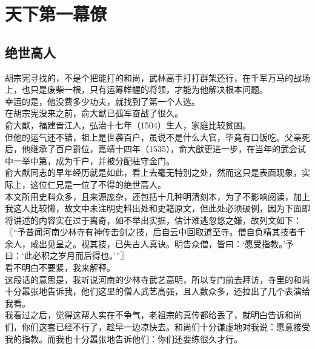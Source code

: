 \section{天下第一幕僚}
\ifnum{}
	\begin{multicols}{\theparacolNo}
\fi
\subsection{绝世高人}
胡宗宪寻找的，不是个把能打的和尚，武林高手打打群架还行，在千军万马的战场上，也只是废柴一根，只有运筹帷幄的将领，才能为他解决根本问题。\\

幸运的是，他没费多少功夫，就找到了第一个人选。\\

在胡宗宪没来之前，俞大猷已孤军奋战了很久。\\

俞大猷，福建晋江人，弘治十七年（1504）生人，家庭比较贫困。\\

但他的运气还不错，祖上是世袭百户，虽说不是什么大官，毕竟有口饭吃。父亲死后，他继承了百户爵位，嘉靖十四年（1535），俞大猷更进一步，在当年的武会试中一举中第，成为千户，并被分配驻守金门。\\

俞大猷同志的早年经历就是如此，看上去毫无特别之处，然而这只是表面现象，实际上，这位仁兄是一位了不得的绝世高人。\\

本文所用史料众多，且来源庞杂，还包括十几种明清刻本，为了不影响阅读，加上我这人比较懒，故文中未注明史料出处和史籍原文，但此处必须破例，因为下面即将讲述的内容实在过于离奇，如不举出实据，估计难逃忽悠之嫌，故列文如下：\\

〖“予昔闻河南少林寺有神传击剑之技，后自云中回取道至寺。僧自负精其技者千余人，咸出见呈之。视其技，已失古人真诀。明告众僧，皆曰：‘愿受指教。’予曰：‘此必积之岁月而后得也。’”〗\\

看不明白不要紧，我来解释。\\

这段话的意思是，我听说河南的少林寺武艺高明，所以专门前去拜访，寺里的和尚十分嚣张地告诉我，他们这里的僧人武艺高强，且人数众多，还拉出了几个表演给我看。\\

我看过之后，觉得这帮人实在不争气，老祖宗的真传都给丢了，就明白告诉和尚们，你们这套已经不行了，趁早一边凉快去。和尚们十分谦虚地对我说：愿意接受我的指教。而我也十分嚣张地告诉他们：你们还要练很久才行。\\


\end{multicols}
